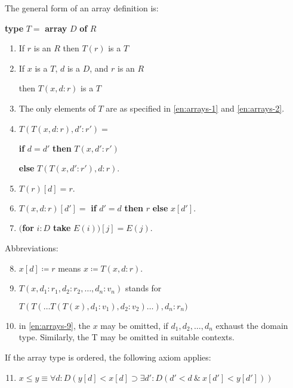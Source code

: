 The general form of an array definition is:

\quad \textbf{type} $T =$ \textbf{array} $D$ \textbf{of} $R$

\begin{enumerate}[leftmargin=2\parindent, label=(\arabic*)]
	\item \label{en:arrays-1}
	If $r$ is an $R$ then $T(r)$ is a $T$

	\item \label{en:arrays-2}
	If $x$ is a $T$, $d$ is a $D$, and $r$ is an $R$

	\quad then $T(x, d:r)$ is a $T$

	\item The only elements of $T$ are as specified in \ref{en:arrays-1} and \ref{en:arrays-2}.

	\item $T(T(x, d:r), d':r') =$

	\textbf{if} $d = d'$ \textbf{then} $T(x, d':r')$

	\tabto*{3.7em}\textbf{else} $T(T(x, d':r'), d:r).$

	\item $T(r)[d] = r.$

	\item $T(x, d:r)[d'] =$ \textbf{if} $d' = d$ \textbf{then} $r$ \textbf{else} $x[d'].$

	\item $($\textbf{for} $i:D$ \textbf{take} $E(i))[j] = E(j).$
\end{enumerate}

\noindent
Abbreviations:

\begin{enumerate}[leftmargin=2\parindent, label=(\arabic*)]
	\setcounter{enumi}{7}
	\item $x[d] \coloneq r$ means $x \coloneq T(x, d:r)$.

	\item\label{en:arrays-9}
	 $T(x, d_1:r_1, d_2 : r_2, \dots, d_n:v_n)$ stands for

	\quad $T(T(\dots T(T(x), d_1:v_1), d_2:v_2)\dots), d_n:r_n)$

	\item in \ref{en:arrays-9}, the $x$ may be omitted, if $d_1, d_2, \dots, d_n$ exhaust the domain type. Similarly, the T may be omitted in suitable contexts.
\end{enumerate}

If the array type is ordered, the following axiom applies:

\begin{enumerate}[leftmargin=2\parindent, label=(\arabic*)]
	\setcounter{enumi}{10}
	\item $x \leqslant y \equiv \forall d: D(y[d] < x[d] \supset \exists d':D(d' < d\ \&\ x[d'] < y[d']))$
\end{enumerate}

